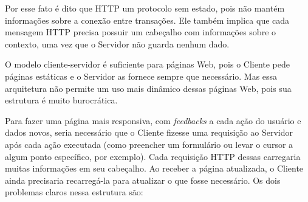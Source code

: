 \documentclass[a4paper,12pt]{article}
\begin{document}
Por esse fato é dito que HTTP um protocolo sem estado, pois não mantém informações sobre a conexão entre transações. Ele também implica que cada mensagem HTTP precisa possuir um cabeçalho com informações sobre o contexto, uma vez que o Servidor não guarda nenhum dado.







O modelo cliente-servidor é suficiente para páginas Web, pois o Cliente pede páginas estáticas e o Servidor as fornece sempre que necessário. Mas essa arquitetura não permite um uso mais dinâmico dessas páginas Web, pois sua estrutura é muito burocrática.

Para fazer uma página mais responsiva, com \emph{feedbacks} a cada ação do usuário e dados novos, seria necessário que o Cliente fizesse uma requisição ao Servidor após cada ação executada (como preencher um formulário ou levar o cursor a algum ponto específico, por exemplo). Cada requisição HTTP dessas carregaria muitas informações em seu cabeçalho. Ao receber a página atualizada, o Cliente ainda precisaria recarregá-la para atualizar o que fosse necessário. Os dois problemas claros nessa estrutura são:
\end{document}
